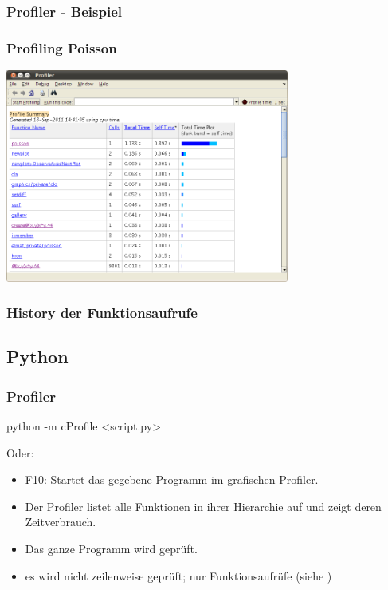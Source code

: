 \documentclass[hyperref={xetex}]{beamer}
\begin{document}
\begin{frame}[fragile]\frametitle{Profiler - Beispiel}
\end{frame}

\begin{frame}[fragile]\frametitle{Profiling Poisson}
\begin{center}
\includegraphics[width=0.7\textwidth]{./figures/profile_poisson}
\end{center}
\end{frame}

\begin{frame}[fragile]\frametitle{History der Funktionsaufrufe}
\end{frame}




\subsection{Python}
\begin{frame}[fragile]\frametitle{Profiler}
\begin{pyin}
python -m cProfile <script.py>
\end{pyin}
Oder: 
  \begin{itemize}
    \item \alert{F10}: Startet das gegebene Programm im grafischen Profiler.
    \item Der Profiler listet alle Funktionen in ihrer Hierarchie auf und zeigt deren Zeitverbrauch.
    \item Das ganze Programm wird geprüft.
    \item es wird nicht zeilenweise geprüft; nur Funktionsaufrüfe (siehe )
  \end{itemize}
\end{frame}
\end{document}

